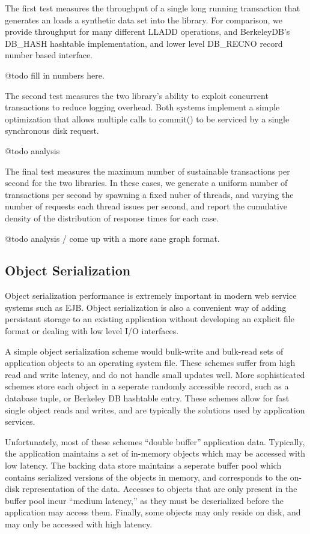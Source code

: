 \documentclass[letterpaper,english]{article}
\begin{document}
The first test measures the throughput of a single long running
transaction that generates an loads a synthetic data set into the
library.  For comparison, we provide throughput for many different
LLADD operations, and BerkeleyDB's DB\_HASH hashtable implementation,
and lower level DB\_RECNO record number based interface.

@todo fill in numbers here.

The second test measures the two library's ability to exploit
concurrent transactions to reduce logging overhead.  Both systems
implement a simple optimization that allows multiple calls to commit()
to be serviced by a single synchronous disk request.  

@todo analysis

The final test measures the maximum number of sustainable transactions
per second for the two libraries.  In these cases, we generate a
uniform number of transactions per second by spawning a fixed nuber of
threads, and varying the number of requests each thread issues per
second, and report the cumulative density of the distribution of
response times for each case.

@todo analysis / come up with a more sane graph format.

\subsection{Object Serialization}

Object serialization performance is extremely important in modern web
service systems such as EJB.  Object serialization is also a
convenient way of adding persistant storage to an existing application
without developing an explicit file format or dealing with low level
I/O interfaces.

A simple object serialization scheme would bulk-write and bulk-read
sets of application objects to an operating system file.  These
schemes suffer from high read and write latency, and do not handle
small updates well.  More sophisticated schemes store each object in a
seperate randomly accessible record, such as a database tuple, or
Berkeley DB hashtable entry.  These schemes allow for fast single
object reads and writes, and are typically the solutions used by
application services.

Unfortunately, most of these schemes ``double buffer'' application
data.  Typically, the application maintains a set of in-memory objects
which may be accessed with low latency.  The backing data store
maintains a seperate buffer pool which contains serialized versions of
the objects in memory, and corresponds to the on-disk representation
of the data.  Accesses to objects that are only present in the buffer
pool incur ``medium latency,'' as they must be deserialized before the
application may access them.  Finally, some objects may only reside on
disk, and may only be accessed with high latency.
\end{document}
